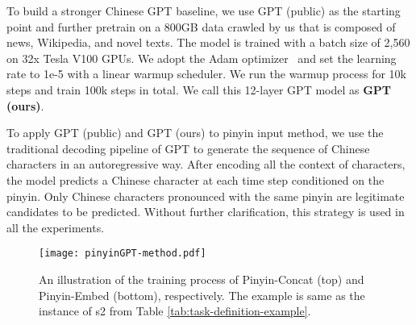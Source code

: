 To build a stronger Chinese GPT baseline, we use GPT (public) as the starting point and further pretrain on a 800GB data crawled by us  that is composed of news, Wikipedia, and novel texts. 
The model is trained with a batch size of 2,560 on 32x Tesla V100 GPUs.
We adopt the Adam optimizer~\cite{kingma2014adam} and set the learning rate to 1e-5 with a linear warmup scheduler. We run the warmup process for 10k steps and train 100k steps in total. 
We call this 12-layer GPT model as \textbf{GPT (ours)}.

To apply GPT (public) and GPT (ours) to pinyin input method, we use the traditional decoding pipeline of GPT to generate the sequence of Chinese characters in an autoregressive way. 
After encoding all the context of characters, the model predicts a Chinese character at each time step conditioned on the pinyin.
Only Chinese characters pronounced with the same pinyin are legitimate candidates to be predicted.
Without further clarification, this strategy is used in all the experiments.




\begin{figure*}[t]
  \centering
  \texttt{[image: pinyinGPT-method.pdf]}
  \caption{An illustration of the training process of Pinyin-Concat (top) and Pinyin-Embed (bottom), respectively. The example is same as the instance of s2 from Table \ref{tab:task-definition-example}. }
  \label{fig:method-pinyingpt}
\end{figure*}


